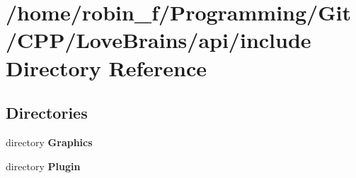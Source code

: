 \section{/home/robin\+\_\+f/\+Programming/\+Git/\+C\+P\+P/\+Love\+Brains/api/include Directory Reference}
\label{dir_f609a4cd87d96f7c03d40ac34a729c60}
\subsection*{Directories}
\begin{DoxyCompactItemize}
\item 
directory {\bf Graphics}
\item 
directory {\bf Plugin}
\end{DoxyCompactItemize}
